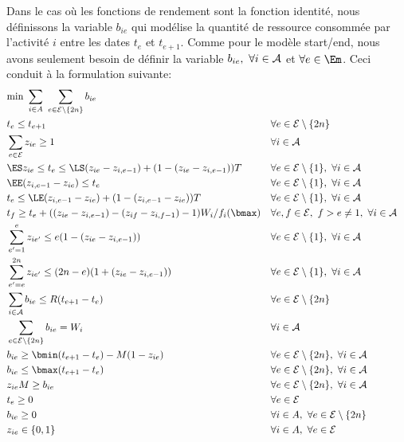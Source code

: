 Dans le cas où les fonctions de rendement sont la fonction identité,
nous définissons la variable $b_{ie}$ qui modélise la quantité de
ressource consommée par l'activité $i$ entre les dates $t_e$ et
$t_{e+1}$. Comme pour le modèle start/end, nous avons seulement besoin
de définir la variable $b_{ie},\ \forall i \in {\cal A}$ et $\forall e \in
\Em$. Ceci conduit à la formulation suivante: 
{\small
\begin{align}
& \text{min } \sum_{i\in A}\ \sum_{e\in \E\setminus
    \{2n\}}b_{ie}
 \label{obj_CECSP_OO}\\ 
&t_e \le t_{e+1} & &\forall e \in \E\setminus
 \{2n\} \label{ordre_CECSP_OO}\\
&\sum_{e \in \E} z_{ie} \ge 1 & & \forall i \in {\cal
   A}\label{start_CECSP_OO}\\
& \ES z_{ie}\le t_e \le \LS(z_{ie}-z_{i,e-1})+(1-(z_{ie}-z_{i,e-1}))T
 & & \forall e \in \E\setminus \{1\},\ \forall i \in {\cal
   A}\label{twx_CECSP_OO}\\
&\EE(z_{i,e-1}-z_{ie})\le t_e & & \forall e \in \E\setminus
 \{1\},\ \forall i \in \A\label{twy1_CECSP_OO}\\
&t_e \le \LE(z_{i,e-1}-z_{ie})+(1-(z_{i,e-1}-z_{ie}))T & & \forall e
 \in \E\setminus \{1\},\ \forall i \in {\cal
   A}\label{twy2_CECSP_OO}\\
&t_f\ge t_e +((z_{ie}-z_{i,e-1})-(z_{if}-z_{i,f-1})-1)W_i/f_i(\bmax) &
 & \forall e,f \in \E,\ f>e\neq 1,\ \forall i \in {\cal
   A} \label{dur_CECSP_OO}\\
&\sum_{e'=1}^{e} z_{ie'} \le e(1-(z_{ie}-z_{i,e-1})) & & \forall e \in
       \E\setminus \{1\},\ \forall i \in \A
\label{preem1_CECSP_OO}\\
&\sum_{e'=e}^{2n} z_{ie'} \le (2n-e)(1+(z_{ie}-z_{i,e-1})) & & \forall
e \in \E\setminus \{1\},\ \forall i \in \A
\label{preem2_CECSP_OO}\\
&\sum_{i\in \A} b_{ie} \le R(t_{e+1}-t_e) & & \forall e \in
      \E\setminus \{2n\}\label{res_CECSP_OO}\\
&\sum_{e \in \E\setminus \{2n\}} b_{ie} = W_i & & \forall i \in
        \A\label{nrj_CECSP_OO}\\
&b_{ie} \ge \bmin(t_{e+1}-t_e) - M(1-z_{ie}) & & \forall e \in {\cal
  E}\setminus \{2n\}, \ \forall i \in \A\label{bmin_CECSP_OO}\\
&b_{ie} \le \bmax(t_{e+1}-t_e) & &\forall e \in \E\setminus
\{2n\},\ \forall i \in \A\label{bmax_CECSP_OO}\\
&z_{ie}M\ge b_{ie} & & \forall e\in \E\setminus \{2n\},
\ \forall i \in \A\label{res0_CECSP_OO}\\
&t_e \ge 0 & & \forall e \in \E \label{eq54}\\
& b_{ie} \ge 0 & & \forall i \in A,\ \forall e \in \E\setminus
\{2n\}
 \label{Bb_CECSP_OO}\\
&z_{ie} \in \{0,1\} & & \forall i \in A,\ \forall e \in {\cal
   E} \label{eq57}
\end{align}
}
